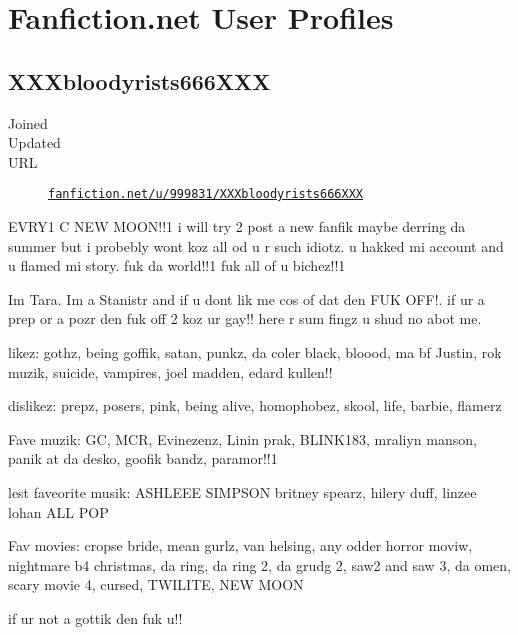 \cleardoublepage\chapter{Fanfiction.net User Profiles}

\section{XXXbloodyrists666XXX}
\begin{description}
	\item[Joined] 
	\item[Updated] 
	\item[URL] \href{https://www.fanfiction.net/u/999831/XXXbloodyrists666XXX}{\texttt{fanfiction.net/u/999831/XXXbloodyrists666XXX}}
\end{description}

EVRY1 C NEW MOON!!1 i will try 2 post a new fanfik
maybe derring da summer but i probebly wont koz all
od u r such idiotz. u hakked mi account and u flamed
mi story. fuk da world!!1 fuk all of u bichez!!1

Im Tara. Im a Stanistr and if u dont lik me cos of
dat den FUK OFF!. if ur a prep or a pozr den fuk off
2 koz ur gay!! here r sum fingz u shud no abot me.

likez: gothz, being goffik, satan, punkz, da coler
black, bloood, ma bf Justin, rok muzik, suicide,
vampires, joel madden, edard kullen!!

dislikez: prepz, posers, pink, being alive,
homophobez, skool, life, barbie, flamerz

Fave muzik: GC, MCR, Evinezenz, Linin prak, BLINK183,
mraliyn manson, panik at da desko, goofik bandz, paramor!!1

\begin{sloppypar}
	lest faveorite musik: ASHLEEE SIMPSON britney spearz,
	hilery duff, linzee lohan ALL POP
\end{sloppypar}

\begin{sloppypar}
	Fav movies: cropse bride, mean gurlz, van helsing, any
	odder horror moviw, nightmare b4 christmas, da ring,
	da ring 2, da grudg 2, saw2 and saw 3, da omen, scary movie 4,
	cursed, TWILITE, NEW MOON
\end{sloppypar}

if ur not a gottik den fuk u!!

